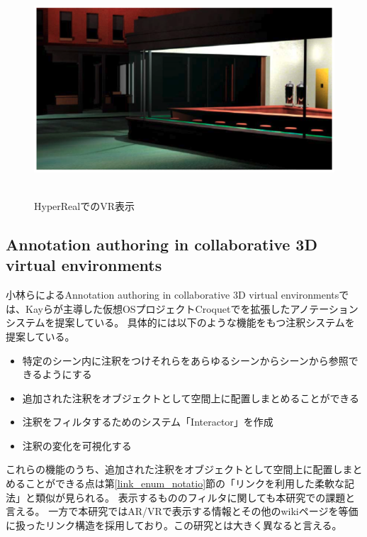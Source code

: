 \begin{figure}[h]
  \centering 
  \includegraphics[height=80mm]{images/HyperReal_vr.png}
  \caption{HyperRealでのVR表示} \label{fig:HyperReal_vr}
\end{figure}


\subsection{Annotation authoring in collaborative 3D virtual environments}
小林らによるAnnotation authoring in collaborative 3D virtual environments\cite{10.1145/1152399.1152452}では、Kayらが主導した仮想OSプロジェクトCroquet\cite{10.5555/1009376.1009395}でを拡張したアノテーションシステムを提案している。
具体的には以下のような機能をもつ注釈システムを提案している。
\begin{itemize} 
  \item 特定のシーン内に注釈をつけそれらをあらゆるシーンからシーンから参照できるようにする
  \item 追加された注釈をオブジェクトとして空間上に配置しまとめることができる
  \item 注釈をフィルタするためのシステム「Interactor」を作成
  \item 注釈の変化を可視化する
\end{itemize}
これらの機能のうち、追加された注釈をオブジェクトとして空間上に配置しまとめることができる点は第\ref{link_enum_notatio}節の「リンクを利用した柔軟な記法」と類似が見られる。
表示するもののフィルタに関しても本研究での課題と言える。
一方で本研究ではAR/VRで表示する情報とその他のwikiページを等価に扱ったリンク構造を採用しており。この研究とは大きく異なると言える。

